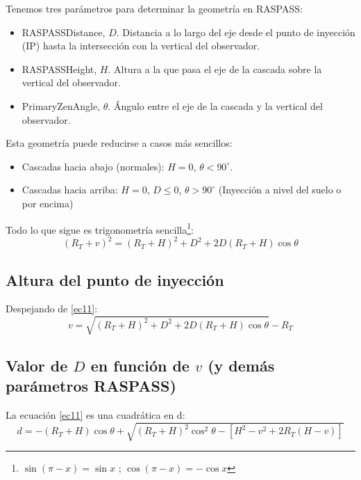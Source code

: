 \documentclass[a4paper,12pt]{article}
\numberwithin{equation}{section}
\numberwithin{figure}{section}
\begin{document}
	Tenemos tres parámetros para determinar la geometría en RASPASS:
	\begin{itemize}
		\item RASPASSDistance, $D$. Distancia a lo largo del eje desde el punto de inyección (IP) hasta la intersección con la vertical del observador.
		\item RASPASSHeight,  $H$. Altura a la que pasa el eje de la cascada sobre la vertical del observador.
		\item PrimaryZenAngle, $\theta$. Ángulo entre el eje de la cascada y la vertical del observador.
	\end{itemize}
Esta geometría puede reducirse a casos más sencillos:
\begin{itemize}
	\item Cascadas hacia abajo (normales): $H = 0$, $\theta<90^\circ$.
	\item Cascadas hacia arriba: $H = 0$, $D \leq 0$, $\theta >90^\circ$ (Inyección a nivel del suelo o por encima)
\end{itemize}
Todo lo que sigue es trigonometría sencilla\footnote{$\sin(\pi-x)=\sin{x}$ ; $\cos(\pi-x)=-\cos{x}$}:
\begin{equation}
	(R_T+v)^2=(R_T+H)^2+D^2+2D(R_T+H)\cos\theta
	\label{ec11}
\end{equation}
\newpage
\subsection{Altura del punto de inyección}
Despejando de \eqref{ec11}:
\begin{equation}
	v = \sqrt{(R_T+H)^2+D^2+2D(R_T+H)\cos\theta}-R_T
	\label{ec12}
\end{equation}
\subsection{Valor de $D$ en función de $v$ (y demás parámetros RASPASS)}
La ecuación \eqref{ec11} es una cuadrática en d:
\begin{equation}
	d=-(R_T+H)\cos\theta+\sqrt{(R_T+H)^2\cos^2\theta-\left[H^2-v^2+2R_T(H-v)\right]}
	\label{ec13}
\end{equation}
\end{document}
